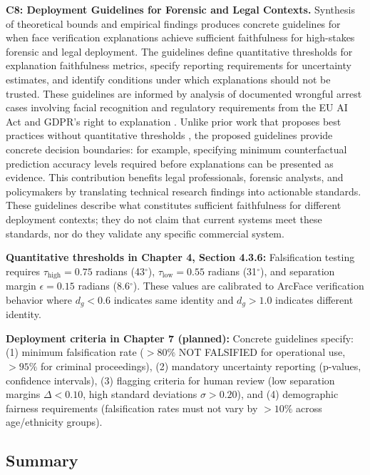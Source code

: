 \textbf{C8: Deployment Guidelines for Forensic and Legal Contexts.} Synthesis of theoretical bounds and empirical findings produces concrete guidelines for when face verification explanations achieve sufficient faithfulness for high-stakes forensic and legal deployment. The guidelines define quantitative thresholds for explanation faithfulness metrics, specify reporting requirements for uncertainty estimates, and identify conditions under which explanations should not be trusted. These guidelines are informed by analysis of documented wrongful arrest cases involving facial recognition \cite{hill2020detroit,hill2023pregnant} and regulatory requirements from the EU AI Act and GDPR's right to explanation \cite{euaiact2024,gdpr2016}. Unlike prior work that proposes best practices without quantitative thresholds \cite{raji2020closing}, the proposed guidelines provide concrete decision boundaries: for example, specifying minimum counterfactual prediction accuracy levels required before explanations can be presented as evidence. This contribution benefits legal professionals, forensic analysts, and policymakers by translating technical research findings into actionable standards. These guidelines describe what constitutes sufficient faithfulness for different deployment contexts; they do not claim that current systems meet these standards, nor do they validate any specific commercial system.

\vspace{0.3cm}
\noindent\textbf{Quantitative thresholds in Chapter 4, Section 4.3.6:} Falsification testing requires $\tau_{\text{high}} = 0.75$ radians (43$^\circ$), $\tau_{\text{low}} = 0.55$ radians (31$^\circ$), and separation margin $\epsilon = 0.15$ radians (8.6$^\circ$). These values are calibrated to ArcFace verification behavior where $d_g < 0.6$ indicates same identity and $d_g > 1.0$ indicates different identity.

\vspace{0.3cm}
\noindent\textbf{Deployment criteria in Chapter 7 (planned):} Concrete guidelines specify: (1) minimum falsification rate ($>80\%$ NOT FALSIFIED for operational use, $>95\%$ for criminal proceedings), (2) mandatory uncertainty reporting (p-values, confidence intervals), (3) flagging criteria for human review (low separation margins $\Delta < 0.10$, high standard deviations $\sigma > 0.20$), and (4) demographic fairness requirements (falsification rates must not vary by $>10\%$ across age/ethnicity groups).

\subsection{Summary}

